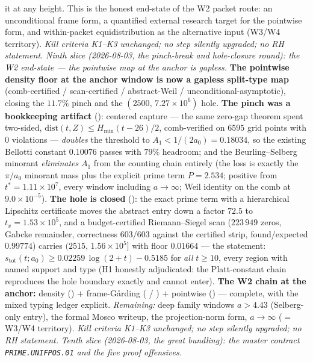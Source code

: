 it at any height.  This is the honest end-state of the W2 packet
route: an unconditional frame form, a quantified external research
target for the pointwise form, and within-packet equidistribution as
the alternative input (W3/W4 territory).  \emph{Kill criteria K1--K3
unchanged; no step silently upgraded; no RH statement.}
\emph{Ninth slice (2026-08-03, the pinch-break and hole-closure
round): the W2 end-state --- the pointwise map at the anchor is
gapless.}  \textbf{The pointwise density floor at the anchor window
is now a gapless split-type map} (comb-certified / scan-certified /
abstract-Weil / unconditional-asymptotic), closing the $11.7\%$
pinch and the $(2500,\,7.27\times10^{6})$ hole.  \textbf{The pinch
was a bookkeeping artifact} ():
centered capture --- the same zero-gap theorem spent two-sided,
$\mathrm{dist}(t,Z)\le H_{\min}(t-26)/2$, comb-verified on $6595$
grid points with $0$ violations --- \emph{doubles} the threshold to
$A_1<1/(2a_0)=0.18034$, so the existing Bellotti constant $0.10076$
passes with $79\%$ headroom; and the Beurling--Selberg minorant
\emph{eliminates} $A_1$ from the counting chain entirely (the loss
is exactly the $\pi/a_0$ minorant mass plus the explicit prime term
$P=2.534$; positive from $t^*=1.11\times10^{7}$, every window
including $a\to\infty$; Weil identity on the comb at
$9.0\times10^{-5}$).  \textbf{The hole is closed}
(): the exact prime term with a
hierarchical Lipschitz certificate moves the abstract entry down a
factor $72.5$ to $t_x=1.53\times10^{5}$, and a budget-certified
Riemann--Siegel scan ($223\,949$ zeros, Gabcke remainder,
correctness $603/603$ against the certified strip, found/expected
$0.99774$) carries $(2515,\,1.56\times10^{5}]$ with floor $0.01664$
--- the statement:
$s_{\mathrm{tot}}(t;a_0)\ge0.02259\,\log(2+t)-0.5185$ for \emph{all}
$t\ge10$, every region with named support and type (H1 honestly
adjudicated: the Platt-constant chain reproduces the hole boundary
exactly and cannot enter).  \textbf{The W2 chain at the anchor:}
density () $+$ frame-G\aa rding
( /
) $+$ pointwise
() --- complete, with the mixed typing
ledger explicit.  \emph{Remaining:} deep family windows $a>4.43$
(Selberg-only entry), the formal Mosco writeup, the projection-norm
form, $a\to\infty$ ($=$ W3/W4 territory).  \emph{Kill criteria
K1--K3 unchanged; no step silently upgraded; no RH statement.}
\emph{Tenth slice (2026-08-03, the great bundling): the master
contract \texttt{PRIME.UNIFPOS.01} and the five proof offensives.}
